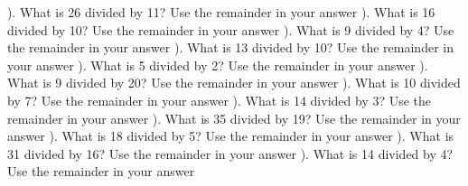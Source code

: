 \documentclass{article}%
\begin{document}
\newline%
). What is 26 divided by 11? Use the remainder in your answer%
\newline%
\newline%
). What is 16 divided by 10? Use the remainder in your answer%
\newline%
\newline%
). What is 9 divided by 4? Use the remainder in your answer%
\newline%
\newline%
). What is 13 divided by 10? Use the remainder in your answer%
\newline%
\newline%
). What is 5 divided by 2? Use the remainder in your answer%
\newline%
\newline%
). What is 9 divided by 20? Use the remainder in your answer%
\newline%
\newline%
). What is 10 divided by 7? Use the remainder in your answer%
\newline%
\newline%
). What is 14 divided by 3? Use the remainder in your answer%
\newline%
\newline%
). What is 35 divided by 19? Use the remainder in your answer%
\newline%
\newline%
). What is 18 divided by 5? Use the remainder in your answer%
\newline%
\newline%
). What is 31 divided by 16? Use the remainder in your answer%
\newline%
\newline%
). What is 14 divided by 4? Use the remainder in your answer%
\newline%
\newline%
\end{document}
